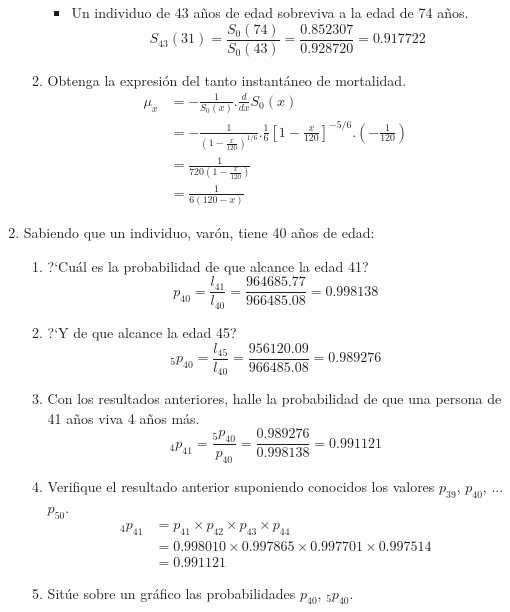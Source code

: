 \documentclass[12pt,a4paper,oneside]{article}\usepackage[]{graphicx}\usepackage[]{color}
\begin{document}
\begin{enumerate}
\begin{enumerate}
\begin{itemize}
            \item Un individuo de 43 años de edad sobreviva a la edad de 74 años.
            \[S_{43}(31)=\frac{S_0(74)}{S_0(43)}=\frac{0.852307}{0.928720}=0.917722\]
      \end{itemize}
      
      \item Obtenga la expresión del tanto instantáneo de mortalidad.
      \begin{align*}
      \mu_x & = -\frac{1}{S_0(x)}.\frac{d}{dx}S_0(x)\\
            & = -\frac{1}{\left(1-\frac{x}{120}\right)^{1/6}}.\frac{1}{6}\left[1-\frac{x}{120}\right]^{-5/6}.\left(-\frac{1}{120}\right)\\
            & = \frac{1}{720\left(1-\frac{x}{120}\right)}\\
            & = \frac{1}{6(120-x)}
      \end{align*}
\end{enumerate}

\item Sabiendo que un individuo, varón, tiene 40 años de edad:
\begin{enumerate}
      \item ?`Cuál es la probabilidad de que alcance la edad 41?
      \[p_{40}=\frac{l_{41}}{l_{40}}=\frac{964685.77}{966485.08}=0.998138\]
      
      \item ?`Y de que alcance la edad 45?
      \[_5p_{40}=\frac{l_{45}}{l_{40}}=\frac{956120.09}{966485.08}=0.989276\]
      
      \item Con los resultados anteriores, halle la probabilidad de que una persona de
41 años viva 4 años más.
      \[_4p_{41}=\frac{_5p_{40}}{p_{40}}= \frac{0.989276}{0.998138} = 0.991121\]

      \item Verifique el resultado anterior suponiendo conocidos los valores $p_{39}$, $p_{40}$, ...
$p_{50}$.
      \begin{align*}
      _4p_{41} & = p_{41}\times p_{42}\times p_{43} \times p_{44}\\
               & = 0.998010 \times 0.997865 \times 0.997701 \times 0.997514\\
               & = 0.991121
      \end{align*}

      \item Sitúe sobre un gráfico las probabilidades $p_{40}$, $_5p_{40}$.
      

\end{enumerate}
\end{enumerate}
\end{document}
